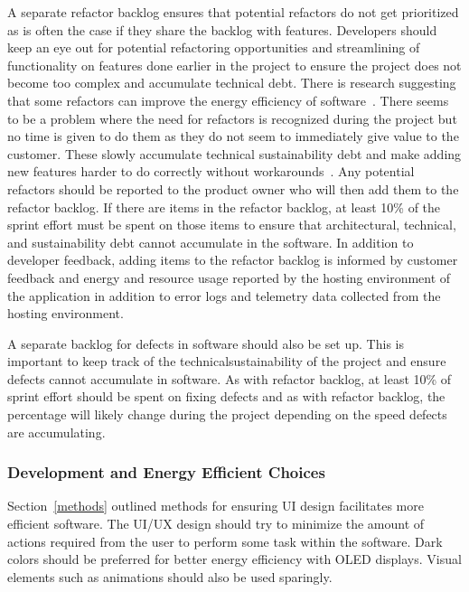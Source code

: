 A separate refactor backlog ensures that potential refactors do not get prioritized as is often the case if they share the backlog with features. Developers should keep an eye out for potential refactoring opportunities and streamlining of functionality on features done earlier in the project to ensure the project does not become too complex and accumulate technical debt. There is research suggesting that some refactors can improve the energy efficiency of software~\cite{refactorforenergyefficiency}. There seems to be a problem where the need for refactors is recognized during the project but no time is given to do them as they do not seem to immediately give value to the customer. These slowly accumulate technical sustainability debt and make adding new features harder to do correctly without workarounds~\cite{sustainabilitydebt}. Any potential refactors should be reported to the product owner who will then add them to the refactor backlog. If there are items in the refactor backlog, at least 10\% of the sprint effort must be spent on those items to ensure that architectural, technical, and sustainability debt cannot accumulate in the software. In addition to developer feedback, adding items to the refactor backlog is informed by customer feedback and energy and resource usage reported by the hosting environment of the application in addition to error logs and telemetry data collected from the hosting environment.

A separate backlog for defects in software should also be set up. This is important to keep track of the \gls{technicalsustainability} of the project and ensure defects cannot accumulate in software. As with refactor backlog, at least 10\% of sprint effort should be spent on fixing defects and as with refactor backlog, the percentage will likely change during the project depending on the speed defects are accumulating.

\subsubsection{Development and Energy Efficient Choices}
Section~\ref{methods} outlined methods for ensuring UI design facilitates more efficient software. The UI/UX design should try to minimize the amount of actions required from the user to perform some task within the software. Dark colors should be preferred for better energy efficiency with OLED displays. Visual elements such as animations should also be used sparingly.

